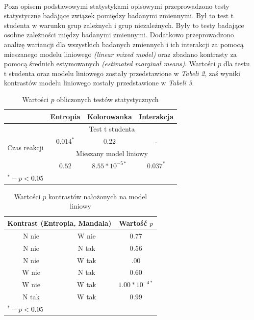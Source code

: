 \documentclass[12pt,a4paper,final,oneside,onecolumn,titlepage]{article}
\begin{document}
\paragraph{}
Poza opisem podstawowymi statystykami opisowymi przeprowadzono testy statystyczne badające związek pomiędzy badanymi zmiennymi. Był to test t studenta w warunku grup zależnych i grup niezależnych. Były to testy badające osobne zależności między badanymi zmiennymi. Dodatkowo przeprowadzono analizę wariancji dla wszystkich badanych zmiennych i ich interakcji za pomocą mieszanego modelu liniowego \textit{(linear mixed model)} oraz zbadano kontrasty za pomocą średnich estymowanych \textit{(estimated marginal means)}. Wartości $p$ dla testu t studenta oraz modelu liniowego zostały przedstawione w \textit{Tabeli 2}, zaś wyniki kontrastów modelu liniowego zostały przedstawione w \textit{Tabeli 3}.
\begin{table}[H]
\caption{Wartości $p$ obliczonych testów statystycznych}
\centering
\begin{tabular}{l c c c}
\hline\hline
 & Entropia & Kolorowanka & Interakcja \\ [0.5ex]
\hline
\multirow{4}{*}{Czas reakcji}& \multicolumn{3}{c}{Test t studenta} \\
 &$0.014^*$&0.22&- \\ [3ex]
 & \multicolumn{3}{c}{Mieszany model liniowy}\\
 &$0.52$&$8.55*10^{-5*}$&$0.037^*$ \\
\hline
\multicolumn{4}{l}{\footnotesize{$^{*} - p<0.05$}}
\end{tabular}
\label{Tabela}
\end{table}
\begin{table}[H]
\caption{Wartości $p$ kontrastów nałożonych na model liniowy}
\centering
\begin{tabular}{c c c}
\hline\hline
\multicolumn{2}{c}{Kontrast (Entropia, Mandala)} & Wartość $p$ \\ [0.5ex]
\hline
N nie & W nie & $0.77$ \\
N nie & N tak & $0.56$ \\
N nie & W tak & $.00$ \\
W nie & N tak & $0.60$ \\
W nie & W tak & $1.00*10^{-4*}$ \\
N tak & W tak & $0.99$ \\
\hline
\multicolumn{3}{l}{\footnotesize{$^{*} - p<0.05$}}
\end{tabular}
\label{Tabela}
\end{table}
\end{document}
